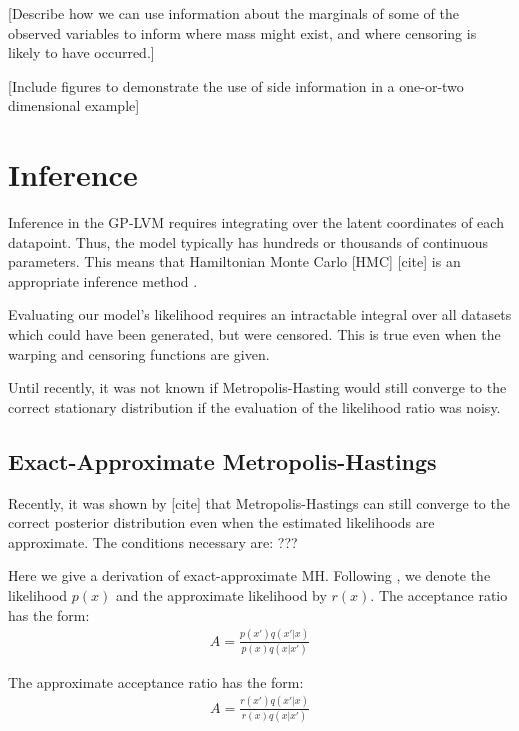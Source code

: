 \documentclass{article}
\begin{document}
[Describe how we can use information about the marginals of some of the observed variables to inform where mass might exist, and where censoring is likely to have occurred.]

[Include figures to demonstrate the use of side information in a one-or-two dimensional example]

\section{Inference}

Inference in the GP-LVM requires integrating over the latent coordinates of each datapoint.  Thus, the model typically has hundreds or thousands of continuous parameters.  This means that Hamiltonian Monte Carlo [HMC] [cite] is an appropriate inference method \cite{IwaDuvGha2012warped}.  

Evaluating our model's likelihood requires an intractable integral over all datasets which could have been generated, but were censored.  This is true even when the warping and censoring functions are given.

Until recently, it was not known if Metropolis-Hasting would still converge to the correct stationary distribution if the evaluation of the likelihood ratio was noisy.

\subsection{Exact-Approximate Metropolis-Hastings}

Recently, it was shown by [cite] that Metropolis-Hastings can still converge to the correct posterior distribution even when the estimated likelihoods are approximate.  The conditions necessary are: ???

Here we give a derivation of exact-approximate MH.  Following \cite{eamcblogWilk10}, we denote the likelihood $p(x)$ and the approximate likelihood by $r(x)$.
%
The acceptance ratio has the form:
%
\begin{align}
A = \frac{p(x') q(x' | x )}{p(x) q(x | x' )}
\end{align}

The approximate acceptance ratio has the form:
%
\begin{align}
A = \frac{r(x') q(x' | x )}{r(x) q(x | x' )}
\label{eqn:approx-acceptence-ratio-simple}
\end{align}
\end{document}

